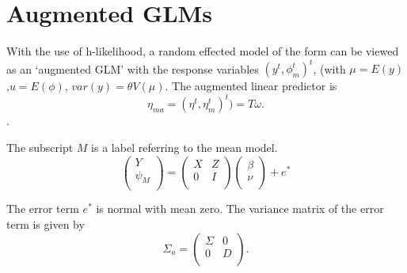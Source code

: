 \documentclass[12pt, a4paper]{article}
\begin{document}




\section{Augmented GLMs} %


With the use of h-likelihood, a random effected model of the form can be viewed as an `augmented GLM' with the response variables $(y^t, \phi^t_m)^t$, (with $\mu = E(y)$,$ u = E(\phi)$, $var(y) = \theta V (\mu)$.
The augmented linear predictor is \[\eta_{ma}  = (\eta^t, \eta^t_m)^t) = T\omega. \].




The subscript $M$ is a label referring to the mean model.
\begin{equation}
\left(%
\begin{array}{c}
  Y \\
  \psi_{M} \\
\end{array}%
\right) = \left(
\begin{array}{cc}
  X & Z \\
  0 & I \\
\end{array}\right) \left(%
\begin{array}{c}
  \beta \\
  \nu \\
\end{array}%
\right)+ e^{*}
\end{equation}








The error term $e^{*}$ is normal with mean zero. The variance matrix of the error term is given by
\begin{equation}
\Sigma_{a} = \left(%
\begin{array}{cc}
  \Sigma & 0 \\
  0 & D \\
\end{array}%
\right).
\end{equation}
\end{document}
